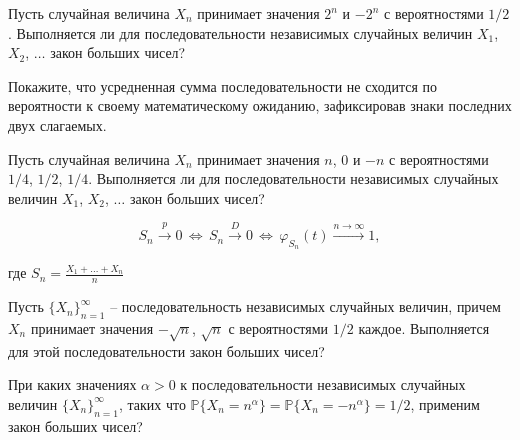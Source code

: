 
\begin{problem}
Пусть случайная величина $X_n$ принимает значения 
$2^n$ и $-2^n$ с вероятностями $1/2$. Выполняется ли для последовательности независимых случайных величин 
$X_1$, $X_2$, $\ldots$ закон больших чисел? 
\end{problem}

\begin{ordre}
Покажите, что усредненная сумма последовательности не сходится по вероятности к своему математическому ожиданию, зафиксировав знаки последних двух слагаемых. 
\end{ordre}


\begin{problem}
Пусть случайная величина $X_n$ принимает значения 
$n$, $0$ и $-n$ с вероятностями $1/4$, $1/2$, $1/4$. Выполняется ли для последовательности независимых случайных величин 
$X_1$, $X_2$, $\ldots$ закон больших чисел? 
\end{problem}

\begin{ordre}
 
$$
S_n\xrightarrow{p}0 \,\Leftrightarrow\, S_n\xrightarrow{D}0 \,\Leftrightarrow\, \varphi_{S_n}(t)
\xrightarrow{n\to\infty}1 , 
$$

где $S_n=\frac{X_1+\ldots +X_n}{n}$

\end{ordre}


\begin{problem}
Пусть $\{ X_n\}_{n=1}^{\infty}$ -- последовательность независимых случайных величин, причем $X_n$ принимает значения 
$-\sqrt{n}$, $\sqrt{n}$ с вероятностями $1/2$ каждое. 
Выполняется для этой последовательности закон больших чисел? 
\end{problem}


\begin{problem}
При каких значениях $\alpha > 0$ к последовательности независимых случайных величин $\{ X_n\}_{n=1}^{\infty}$, 
таких что ${\mathbb P}\{ X_n=n^{\alpha}\}={\mathbb P}\{ X_n=-n^{\alpha}\}=1/2$, применим закон больших чисел? 
\end{problem}

\begin{comment}
\begin{ordre}
Докажите достаточное условие выполнения ЗБЧ:
 \[
Var S_n \xrightarrow {n\to\infty}0
\] 
\end{ordre}
\end{comment}

